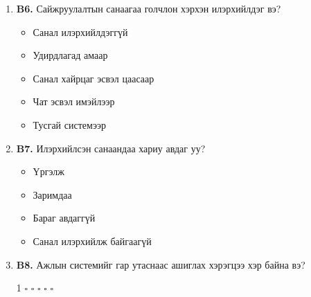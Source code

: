 \begin{enumerate}[label={}, leftmargin=0pt]
\begin{itemize}[label=$\square$]
  \item Бараг тасалддаггүй
  \item Сард хэдэн удаа
  \item Долоо хоногт хэдэн удаа
  \item Өдөр бүр
  \item Зарим газарт огт байхгүй
\end{itemize}
\item \textbf{B6.} Сайжруулалтын санаагаа голчлон хэрхэн илэрхийлдэг вэ?
\begin{itemize}[label=$\square$]
  \item Санал илэрхийлдэггүй
  \item Удирдлагад амаар
  \item Санал хайрцаг эсвэл цаасаар
  \item Чат эсвэл имэйлээр
  \item Тусгай системээр
\end{itemize}
\item \textbf{B7.} Илэрхийлсэн санаандаа хариу авдаг уу?
\begin{itemize}[label=$\square$]
  \item Үргэлж
  \item Заримдаа
  \item Бараг авдаггүй
  \item Санал илэрхийлж байгаагүй
\end{itemize}
\item \textbf{B8.} Ажлын системийг гар утаснаас ашиглах хэрэгцээ хэр байна вэ?
\par 1 $\square$  $\square$  $\square$  $\square$  $\square$
\end{enumerate}

